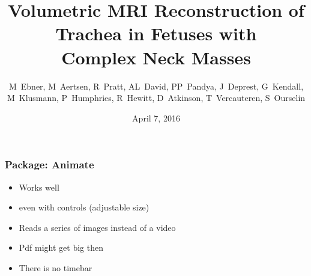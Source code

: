 \documentclass[compress,12pt,handout]{beamer} %
\title[Volumetric MRI Reconstruction of Fetal Neck Mass Trachea]{Volumetric MRI Reconstruction of \\Trachea in Fetuses with \\Complex Neck Masses}
\author[Michael Ebner]
    {
      \vspace{-0.2cm}
        {\scriptsize M~Ebner, M~Aertsen, R~Pratt, AL~David, PP~Pandya, J~Deprest, G~Kendall, M~Klusmann, P~Humphries, R~Hewitt, D~Atkinson, T~Vercauteren, S~Ourselin}%
    }
\institute[UCL]{%
    \vspace{-0.3cm}\\%
    Fetal, Neonatal and Paediatric MR Imaging:\\%
    Techniques and Applications
}
\date{April 7, 2016}
\begin{document}
{   
    \begin{frame}
      \vspace{-0.6cm}
      \titlepage
    \end{frame}
}


\begin{frame}[t]\frametitle{Package: Animate}\centering
  \begin{itemize}
    \item Works well
    \item even with controls (adjustable size)
    \item Reads a series of images instead of a video
    \item Pdf might get big then
    \item There is no timebar
  \end{itemize}
\end{frame}
\end{document}
